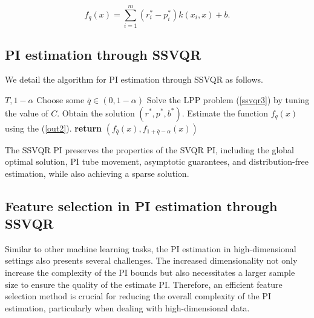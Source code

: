 \documentclass[10pt]{article} %
\begin{document}
\begin{equation}
    f_q(x) = \sum_{i=1}^{m}(r_i^{*}- p_i^{*})k(x_i,x) + b . \label{out2}
\end{equation}
 
\subsection{PI estimation through SSVQR}
We detail the algorithm for PI estimation through SSVQR as follows.
\begin{algorithm}
\caption{PI estimation through SSVQR}\label{alg:euclid}
\begin{algorithmic}[1]
 {$T,1-\alpha$}
\State Choose some $\bar{q} \in (0,1-\alpha)$ 
\State Solve the LPP problem (\ref{ssvqr3}) by tuning the value of $C$. Obtain the solution $(r^*,p^*,b^*)$.
\State  Estimate the function $f_q(x)$ using the (\ref{out2}). 
\EndFor\label{euclidendwhile}
\State \textbf{return} $(f_{\bar{q}}(x),f_{1+\bar{q}-\alpha}(x))$
\EndProcedure
\end{algorithmic}
\end{algorithm}
The SSVQR PI preserves the properties of the SVQR PI, including the global optimal solution, PI tube movement, asymptotic guarantees, and distribution-free estimation, while also achieving a sparse solution.


\subsection{Feature selection in PI estimation through SSVQR}
Similar to other machine learning tasks, the PI estimation in high-dimensional settings also presents several challenges. The increased dimensionality not only increase the complexity of the PI bounds but also necessitates a larger sample size to ensure the quality of the estimate PI. Therefore, an efficient feature selection method is crucial for reducing the overall complexity of  the PI estimation, particularly when dealing with high-dimensional data.
\end{document}
